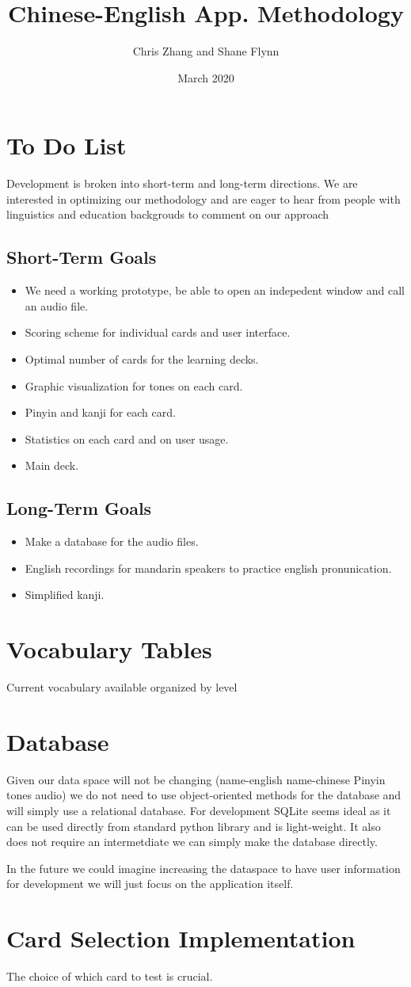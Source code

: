 \documentclass{article}
\title{Chinese-English App. Methodology}
\author{Chris Zhang and Shane Flynn}
\date{March 2020}
\begin{document}
\section*{To Do List}
Development is broken into short-term and long-term directions.
We are interested in optimizing our methodology and are eager to hear from
people with linguistics and education backgrouds to comment on our approach

\subsection*{Short-Term Goals}
\begin{itemize}
  \item  We need a working prototype, be able to open an indepedent window and
  call an audio file.
  \item Scoring scheme for individual cards and user interface.
  \item Optimal number of cards for the learning decks.
  \item Graphic visualization for tones on each card.
  \item Pinyin and kanji for each card.
  \item Statistics on each card and on user usage.
  \item Main deck.
\end{itemize}

\subsection*{Long-Term Goals}
\begin{itemize}
  \item Make a database for the audio files.
  \item English recordings for mandarin speakers to practice english
  pronunication.
  \item Simplified kanji.
\end{itemize}

\section*{Vocabulary Tables}
Current vocabulary available organized by level

\section*{Database}
Given our data space will not be changing (name-english name-chinese Pinyin
tones audio) we do not need to use object-oriented methods for the database and will
simply use a relational database.
For development SQLite seems ideal as it can be used directly from standard
python library and is light-weight.
It also does not require an intermetdiate we can simply make the database
directly.

In the future we could imagine increasing the dataspace to have user information
for development we will just focus on the application itself.

\section*{Card Selection Implementation}
The choice of which card to test is crucial.
\end{document}
